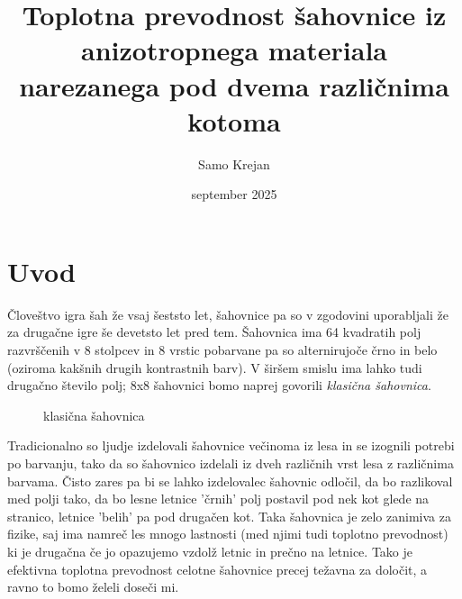 \documentclass[12pt]{article}
\title{\textbf{Toplotna prevodnost šahovnice iz anizotropnega materiala narezanega pod dvema različnima kotoma}}
\author{Samo Krejan}
\date{september 2025}
\begin{document}
\maketitle

\section{Uvod}

Človeštvo igra šah že vsaj šeststo let, šahovnice pa so v zgodovini uporabljali že za drugačne igre še devetsto let pred tem. Šahovnica ima 64 kvadratih polj razvrščenih v 8 stolpcev in 8 vrstic pobarvane pa so alternirujoče črno in belo (oziroma kakšnih drugih kontrastnih barv). V širšem smislu ima lahko tudi drugačno število polj; 8x8 šahovnici bomo naprej govorili \textit{klasična šahovnica}.


\begin{figure}[htbp]
  \centering

  \caption{klasična šahovnica}
  \label{fig:classical_chessboard}
\end{figure}

Tradicionalno so ljudje izdelovali šahovnice večinoma iz lesa in se izognili potrebi po barvanju, tako da so šahovnico izdelali iz dveh različnih vrst lesa z različnima barvama. Čisto zares pa bi se lahko izdelovalec šahovnic odločil, da bo razlikoval med polji tako, da bo lesne letnice 'črnih' polj postavil pod nek kot glede na stranico, letnice 'belih' pa pod drugačen kot. Taka šahovnica je zelo zanimiva za fizike, saj ima namreč les mnogo lastnosti (med njimi tudi toplotno prevodnost) ki je drugačna če jo opazujemo vzdolž letnic in prečno na letnice. Tako je efektivna toplotna prevodnost celotne šahovnice precej težavna za določit, a ravno to bomo želeli doseči mi.
\newpage
\end{document}
